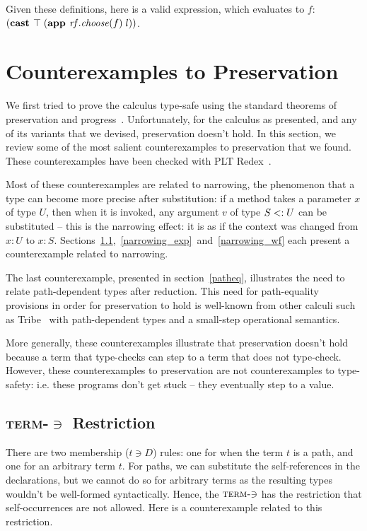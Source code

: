 \documentclass[9pt]{sigplanconf}
\begin{document}
Given these definitions, here is a valid expression, which evaluates to $f$:
$(\textbf{cast }\top\;(\textbf{app }{\mathit{rf.choose}}(f)\;l))$.

\section{Counterexamples to Preservation}\label{dot-preservation}

We first tried to prove the calculus type-safe using the standard
theorems of preservation and
progress~\cite{soundness,tapl}. Unfortunately, for the calculus as
presented, and any of its variants that we devised, preservation
doesn't hold. In this section, we review some of the most salient
counterexamples to preservation that we found. These counterexamples
have been checked with PLT Redex~\cite{plt_redex}.

Most of these counterexamples are related to narrowing, the phenomenon
that a type can become more precise after substitution: if a method
takes a parameter $x$ of type $U$, then when it is invoked, any
argument $v$ of type $S <: U$ can be substituted -- this is the
narrowing effect: it is as if the context was changed from $x : U$ to
$x : S$. Sections~\ref{term_mem},~\ref{narrowing_exp}~and~\ref{narrowing_wf} each
present a counterexample related to narrowing.

The last counterexample, presented in section~\ref{patheq},
illustrates the need to relate path-dependent types after
reduction. This need for path-equality provisions in order for
preservation to hold is well-known from other calculi such as
Tribe~\cite{tribe} with path-dependent types and a small-step
operational semantics.

More generally, these counterexamples illustrate that preservation
doesn't hold because a term that type-checks can step to a term that
does not type-check. However, these counterexamples to preservation are
not counterexamples to type-safety: i.e. these programs don't get
stuck -- they eventually step to a value.

\subsection{\texorpdfstring{\textsc{term-$\ni$}}{Term-Mem} Restriction}\label{term_mem}

There are two membership ($t \ni D$) rules: one for when the term $t$
is a path, and one for an arbitrary term $t$. For paths, we can
substitute the self-references in the declarations, but we cannot do
so for arbitrary terms as the resulting types wouldn't be well-formed
syntactically. Hence, the $\textsc{term-$\ni$}$ has the restriction
that self-occurrences are not allowed. Here is a counterexample related
to this restriction.
\end{document}
